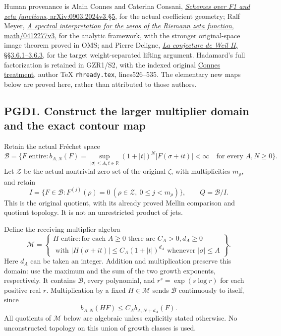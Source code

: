 Human provenance is Alain Connes and Caterina Consani,
\href{https://arxiv.org/abs/0903.2024v3}{\emph{Schemes over F1 and zeta
functions}, arXiv:0903.2024v3 §5}, for the actual coefficient geometry;
Ralf Meyer, \href{https://arxiv.org/abs/math/0412277v3}{\emph{A spectral
interpretation for the zeros of the Riemann zeta function},
math/0412277v3}, for the analytic framework, with the stronger
original-space image theorem proved in OMS; and Pierre Deligne,
\href{https://www.numdam.org/item/PMIHES_1980__52__137_0/}{\emph{La
conjecture de Weil II}, §§3.6.1--3.6.3}, for the target weight-separated
lifting argument. Hadamard's full factorization is retained in GZR1/S2,
with the indexed original
\href{https://arxiv.org/abs/2602.04022v1}{Connes treatment}, author TeX
\nolinkurl{rhready.tex}, lines526--535. The elementary new maps below are
proved here, rather than attributed to those authors.

\subsection{PGD1. Construct the larger multiplier domain and the exact
contour
map}\label{pgd1.-construct-the-larger-multiplier-domain-and-the-exact-contour-map}

Retain the actual Fréchet space \[
\mathcal B=\{F\text{ entire}:b_{A,N}(F)=
\sup_{|\sigma|\le A,t\in\mathbb R}(1+|t|)^N|F(\sigma+it)|<\infty
\quad\text{for every }A,N\ge0\}.
\] Let \(\mathscr Z\) be the actual nontrivial zero set of the original
\(\zeta\), with multiplicities \(m_\rho\), and retain \[
I=\{F\in\mathcal B:F^{(j)}(\rho)=0
\ (\rho\in\mathscr Z,\ 0\le j<m_\rho)\},\qquad Q=\mathcal B/I.
\tag{PGD1.1}
\] This is the original quotient, with its already proved Mellin
comparison and quotient topology. It is not an unrestricted product of
jets.

Define the receiving multiplier algebra \[
\mathcal M=\left\{\begin{gathered}H\text{ entire}: \text{for each }A\ge0\text{ there are }C_A>0,d_A\ge0\\
\text{ with } |H(\sigma+it)|\le C_A(1+|t|)^{d_A}
\text{ whenever }|\sigma|\le A\end{gathered}\right\}.
\tag{PGD1.2}
\] Here \(d_A\) can be taken an integer. Addition and multiplication
preserve this domain: use the maximum and the sum of the two growth
exponents, respectively. It contains \(\mathcal B\), every polynomial,
and \(r^s=\exp(s\log r)\) for each positive real \(r\). Multiplication
by a fixed \(H\in\mathcal M\) sends \(\mathcal B\) continuously to
itself, since \[
b_{A,N}(HF)\le C_A b_{A,N+d_A}(F).
\tag{PGD1.3}
\] All quotients of \(\mathcal M\) below are algebraic unless explicitly
stated otherwise. No unconstructed topology on this union of growth
classes is used.

